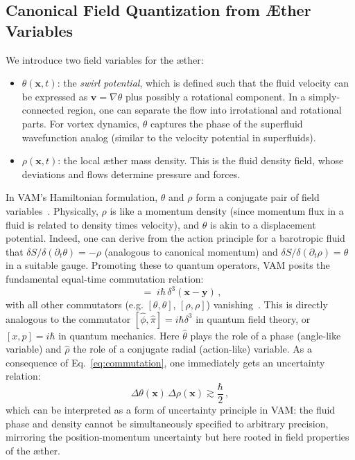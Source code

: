\documentclass[a4paper,12pt]{article}
\begin{document}
    \subsection{Canonical Field Quantization from Æther Variables}
    We introduce two field variables for the æther:
    \begin{itemize}
        \item $\theta(\mathbf{x},t)$: the \emph{swirl potential}, which is defined such that the fluid velocity can be expressed as $\mathbf{v} = \nabla \theta$ plus possibly a rotational component. In a simply-connected region, one can separate the flow into irrotational and rotational parts. For vortex dynamics, $\theta$ captures the phase of the superfluid wavefunction analog (similar to the velocity potential in superfluids).
        \item $\rho(\mathbf{x},t)$: the local æther mass density. This is the fluid density field, whose deviations and flows determine pressure and forces.
    \end{itemize}
    In VAM’s Hamiltonian formulation, $\theta$ and $\rho$ form a conjugate pair of field variables~\cite{reference_57}. Physically, $\rho$ is like a momentum density (since momentum flux in a fluid is related to density times velocity), and $\theta$ is akin to a displacement potential. Indeed, one can derive from the action principle for a barotropic fluid that $\delta S / \delta (\partial_t \theta) = -\rho$ (analogous to canonical momentum) and $\delta S / \delta (\partial_t \rho) = \theta$ in a suitable gauge. Promoting these to quantum operators, VAM posits the fundamental equal-time commutation relation:
    \begin{equation}
    [\hat{\theta}(\mathbf{x}),\, \hat{\rho}(\mathbf{y})] \;=\; i \hbar \,\delta^3(\mathbf{x}-\mathbf{y})\,,
    \label{eq:commutation}
    \end{equation}
    with all other commutators (e.g. $[\theta,\theta]$, $[\rho,\rho]$) vanishing~\cite{reference_58}. This is directly analogous to the commutator $[ \hat{\phi}, \hat{\pi} ] = i\hbar \delta^3$ in quantum field theory, or $[x,p]=i\hbar$ in quantum mechanics. Here $\hat{\theta}$ plays the role of a phase (angle-like variable) and $\hat{\rho}$ the role of a conjugate radial (action-like) variable. As a consequence of Eq.~\eqref{eq:commutation}, one immediately gets an uncertainty relation:
    \[
        \Delta \theta(\mathbf{x}) \,\Delta \rho(\mathbf{x}) \gtrsim \frac{\hbar}{2}\,,
    \]
    which can be interpreted as a form of uncertainty principle in VAM: the fluid phase and density cannot be simultaneously specified to arbitrary precision, mirroring the position-momentum uncertainty but here rooted in field properties of the æther.
\end{document}
